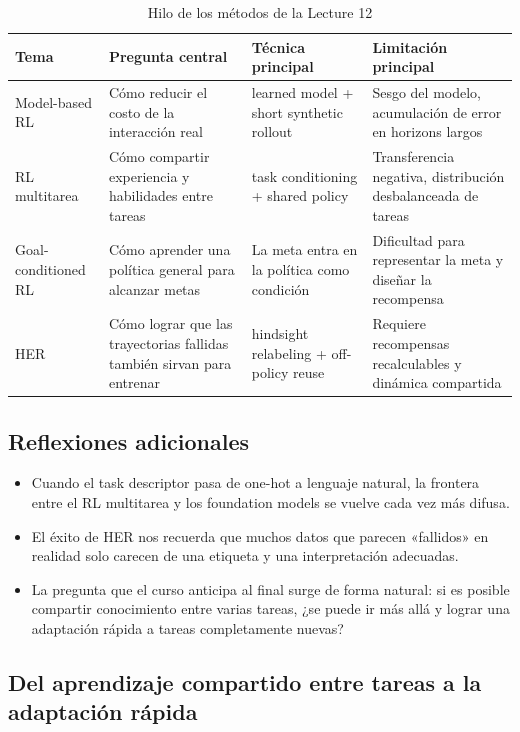 \documentclass[a4paper]{article}
\begin{document}
\begin{table}[H]
\centering
\begin{tabular}{p{} p{} p{} p{}}
\toprule
Tema & Pregunta central & Técnica principal & Limitación principal \\
\midrule
Model-based RL & Cómo reducir el costo de la interacción real & learned model + short synthetic rollout & Sesgo del modelo, acumulación de error en horizons largos \\
RL multitarea & Cómo compartir experiencia y habilidades entre tareas & task conditioning + shared policy & Transferencia negativa, distribución desbalanceada de tareas \\
Goal-conditioned RL & Cómo aprender una política general para alcanzar metas & La meta entra en la política como condición & Dificultad para representar la meta y diseñar la recompensa \\
HER & Cómo lograr que las trayectorias fallidas también sirvan para entrenar & hindsight relabeling + off-policy reuse & Requiere recompensas recalculables y dinámica compartida \\
\bottomrule
\end{tabular}
\caption{Hilo de los métodos de la Lecture 12}
\end{table}

\subsection{Reflexiones adicionales}

\begin{itemize}
    \item Cuando el task descriptor pasa de one-hot a lenguaje natural, la frontera entre el RL multitarea y los foundation models se vuelve cada vez más difusa.
    \item El éxito de HER nos recuerda que muchos datos que parecen «fallidos» en realidad solo carecen de una etiqueta y una interpretación adecuadas.
    \item La pregunta que el curso anticipa al final surge de forma natural: si es posible compartir conocimiento entre varias tareas, ¿se puede ir más allá y lograr una adaptación rápida a tareas completamente nuevas?
\end{itemize}

\subsection{Del aprendizaje compartido entre tareas a la adaptación rápida}
\end{document}
